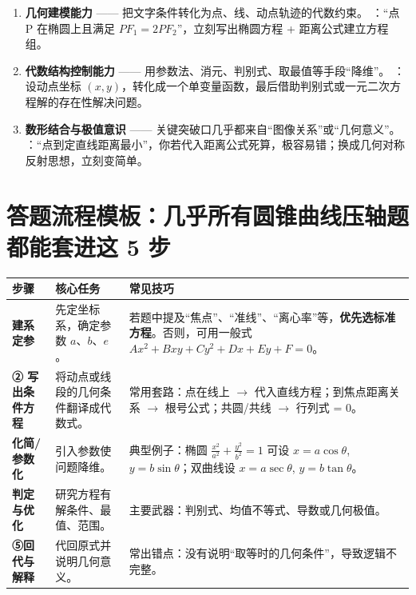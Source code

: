 \documentclass{article}
\begin{document}
	\begin{enumerate}[label=\arabic*.]
		\item \textbf{几何建模能力}
		\newline—— 把文字条件转化为点、线、动点轨迹的代数约束。
		：``点 P 在椭圆上且满足 $PF_1 = 2PF_2$''，立刻写出椭圆方程 + 距离公式建立方程组。
		
		\item \textbf{代数结构控制能力}
		\newline—— 用参数法、消元、判别式、取最值等手段``降维''。
		：设动点坐标 $(x, y)$，转化成一个单变量函数，最后借助判别式或一元二次方程解的存在性解决问题。
		
		\item \textbf{数形结合与极值意识}
		\newline—— 关键突破口几乎都来自``图像关系''或``几何意义''。
		：``点到定直线距离最小''，你若代入距离公式死算，极容易错；换成几何对称反射思想，立刻变简单。
	\end{enumerate}

	
	\section{答题流程模板：几乎所有圆锥曲线压轴题都能套进这 5 步}
	
	\begin{table}[h]
		\centering
		\begin{tabular}{|p{2.5cm}|p{4cm}|p{5.5cm}|}
			\hline
			\textbf{步骤} & \textbf{核心任务} & \textbf{常见技巧} \\
			\hline
			\textbf{建系定参} & 先定坐标系，确定参数 $a$、$b$、$e$。 & 若题中提及``焦点''、``准线''、``离心率''等，\textbf{优先选标准方程}。否则，可用一般式 $Ax^2 + Bxy + Cy^2 + Dx + Ey + F = 0$。 \\
			\hline
			\textbf{② 写出条件方程} & 将动点或线段的几何条件翻译成代数式。 & 常用套路：点在线上 $\rightarrow$ 代入直线方程；到焦点距离关系 $\rightarrow$ 根号公式；共圆/共线 $\rightarrow$ 行列式 = 0。 \\
			\hline
			\textbf{化简/参数化} & 引入参数使问题降维。 & 典型例子：椭圆 $\frac{x^2}{a^2} + \frac{y^2}{b^2} = 1$ 可设 $x = a\cos\theta$, $y = b\sin\theta$；双曲线设 $x = a\sec\theta$, $y = b\tan\theta$。 \\
			\hline
			\textbf{判定与优化} & 研究方程有解条件、最值、范围。 & 主要武器：判别式、均值不等式、导数或几何极值。 \\
			\hline
			\textbf{⑤回代与解释} & 代回原式并说明几何意义。 & 常出错点：没有说明``取等时的几何条件''，导致逻辑不完整。 \\
			\hline
		\end{tabular}
	\end{table}
	
\end{document}
